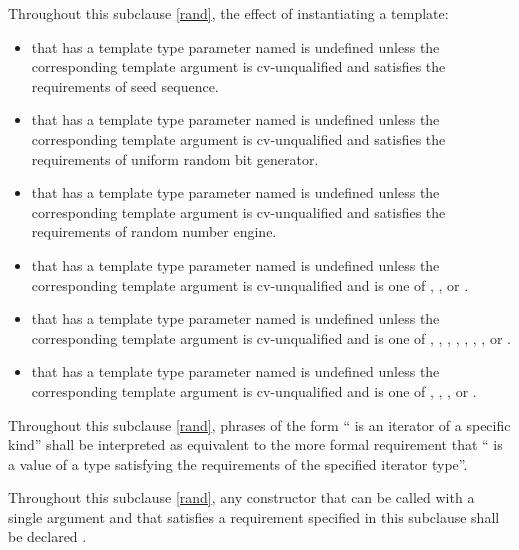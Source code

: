 \pnum
Throughout this subclause \ref{rand},
the effect of instantiating a template:
\begin{itemize}
  \item
    that has a template type parameter
    named 
    is undefined unless the corresponding template argument
    is cv-unqualified and
    satisfies the requirements
    of seed sequence.
  \item
    that has a template type parameter
    named 
    is undefined unless the corresponding template argument
    is cv-unqualified and
    satisfies the requirements
    of uniform random bit generator.
  \item
    that has a template type parameter
    named 
    is undefined unless the corresponding template argument
    is cv-unqualified and
    satisfies the requirements
    of random number engine.
  \item
    that has a template type parameter
    named 
    is undefined unless the corresponding template argument
    is cv-unqualified and
    is one of
    , , or .
  \item
    that has a template type parameter
    named 
    is undefined unless the corresponding template argument
    is cv-unqualified and
    is one of
      ,
      ,
      ,
      ,
      ,
      ,
      ,
      or
      .
  \item
    that has a template type parameter
    named 
    is undefined unless the corresponding template argument
    is cv-unqualified and
    is one of
      ,
      ,
      ,
      or
      .
\end{itemize}

\pnum
Throughout this subclause \ref{rand},
phrases of the form `` is an iterator of a specific kind''
shall be interpreted as equivalent to the more formal requirement that
`` is a value
of a type satisfying the requirements
of the specified iterator type''.

\pnum
Throughout this subclause \ref{rand},
any constructor that can be called with a single argument
and that satisfies a requirement specified in this subclause
shall be declared .


